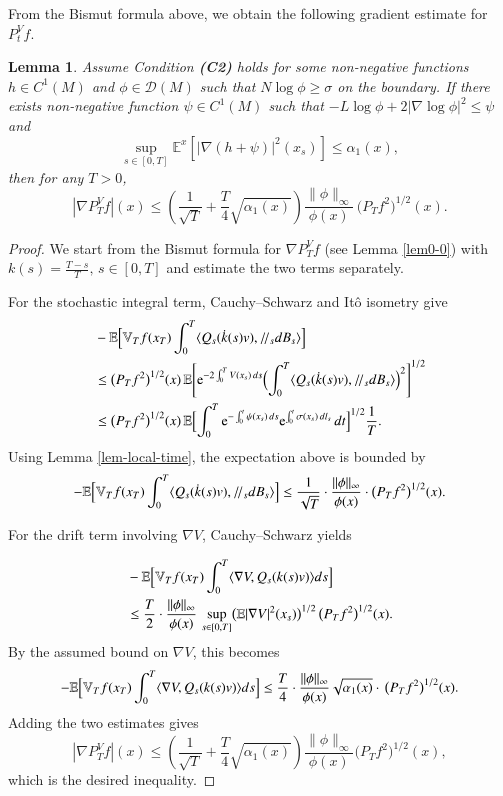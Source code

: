 \documentclass[11pt,twoside, reqno]{article}
\def\ptr {/\!/}
\def\e{{\rm e}}
\newcommand\1{\mathbbm{1}}
\newtheorem{lemma}[theorem]{Lemma}
\theoremstyle{definition}
\numberwithin{equation}{section}
\def \e{{\rm e}}
\begin{document}
From the Bismut formula above, we obtain the following gradient estimate for \(P^V_t f\).


\begin{lemma}\label{lem0}
Assume Condition {\bf (C2)} holds for some non-negative functions \( h \in C^1(M) \) and \( \phi \in \mathcal{D}(M) \)  such that  \( N \log \phi \geq \sigma \) on the boundary. If  there exists non-negative function $\psi\in C^1(M)$ such that   $- L \log \phi + 2|\nabla \log \phi|^2\leq \psi$ and
\[
\sup_{s \in [0,T]} \mathbb{E}^x \left[ \left| \nabla (h+\psi)  \right|^2 (x_s) \right] \leq \alpha_1(x),
\]  
then for any \(T>0\), 
\[
|\nabla P_T^V f|(x) \leq \left(\frac{1}{\sqrt{T}}  + \frac{T}{4} \sqrt{\alpha_1(x)} \right) 
\frac{\|\phi\|_{\infty}}{\phi(x)} \,  \bigl(P_T f^2\bigr)^{1/2}(x).
\]
\end{lemma}

\begin{proof}
We start from the Bismut formula for $\nabla P_T^V f$ (see Lemma \ref{lem0-0})
with  \(k(s)=\frac{T-s}{T},\, s\in [0,T]\) and estimate the two terms separately.

For the stochastic integral term, Cauchy–Schwarz and Itô isometry give  
\[
\begin{aligned}
&-\mathbb{E} \Bigl[ \mathbb{V}_T f(x_T) \int_0^T \langle Q_s (\dot{k}(s) v), \ptr_s dB_s \rangle \Bigr] \\
&\leq   \bigl(P_T f^2\bigr)^{1/2}(x)\,
\mathbb{E} \Biggl[ \e^{-2\int_0^T V(x_s) \,ds} \Bigl(\int_0^T 
\langle  Q_s (\dot{k}(s) v), \ptr_s dB_s \rangle \Bigr)^2 \Biggr] ^{1/2}\\
&\leq  \bigl(P_T f^2\bigr)^{1/2}(x)\,
\mathbb{E} \Bigl[ \int_0^T \e^{ -\int_0^t \psi(x_s) \, ds} 
\e^{\int_0^t \sigma(x_s) \,d l_s}\, dt \Bigr]^{1/2} \frac{1}{T} .
\end{aligned}
\]  
Using  Lemma \ref{lem-local-time}, the expectation above is bounded by 
\[
-\mathbb{E} \Bigl[ \mathbb{V}_T f(x_T) \int_0^T \langle Q_s (\dot{k}(s) v), \ptr_s dB_s \rangle \Bigr]
\leq \frac{1}{\sqrt{T}} \cdot \frac{\|\phi\|_{\infty}}{\phi(x)} \cdot \bigl(P_T f^2\bigr)^{1/2}(x).
\]

For the drift term involving \(\nabla V\), Cauchy–Schwarz yields  

\[
\begin{aligned}
&-\mathbb{E} \Bigl[ \mathbb{V}_T f(x_T) \int_0^T \langle \nabla V, Q_s (k(s) v) \rangle ds \Bigr] \\
&\leq \frac{T}{2}\cdot 
\frac{\|\phi\|_{\infty}}{\phi(x)} \,
\sup_{s\in[0,T]} \bigl(\mathbb{E} |\nabla V|^2 (x_s)\bigr)^{1/2} \, \bigl(P_T f^2\bigr)^{1/2}(x).
\end{aligned}
\]  
By the assumed bound on \(\nabla V\), this becomes  
\[
-\mathbb{E} \Bigl[ \mathbb{V}_T f(x_T) \int_0^T \langle \nabla V, Q_s (k(s) v) \rangle ds \Bigr]  
\leq \frac{T}{4} \cdot \frac{\|\phi\|_{\infty}}{\phi(x)} \sqrt{ \alpha_1(x)} \cdot  \,\bigl(P_T f^2\bigr)^{1/2}(x).
\]
Adding the two estimates gives  
\[
|\nabla P_T^V f|(x) \leq 
\left( \frac{1}{\sqrt{T}} + \frac{T}{4}\sqrt{ \alpha_1(x)} \right) 
\frac{\|\phi\|_{\infty}}{\phi(x)} \bigl(P_T f^2\bigr)^{1/2}(x),
\]
which is the desired inequality.
\end{proof}
\end{document}
